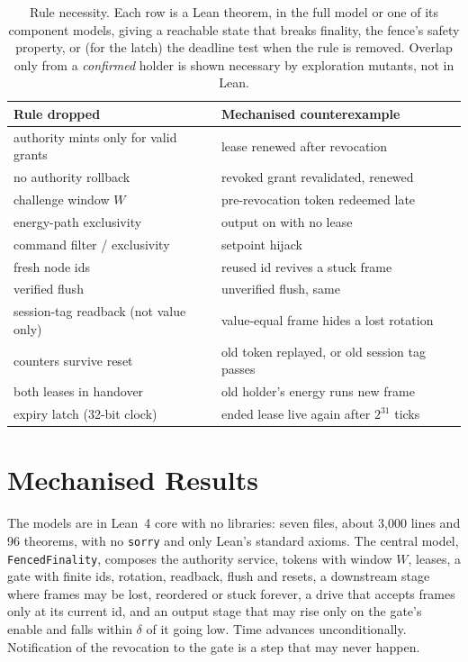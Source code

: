 \documentclass[letterpaper]{article} %
\newcommand{\code}[1]{\texttt{#1}}
\begin{document}
\begin{table}[t]
\centering
\footnotesize
\begin{tabular}{@{}p{3.05cm}p{4.3cm}@{}}
\toprule
Rule dropped & Mechanised counterexample \\
\midrule
authority mints only for valid grants & lease renewed after revocation \\
no authority rollback & revoked grant revalidated, renewed \\
challenge window $W$ & pre-revocation token redeemed late \\
energy-path exclusivity & output on with no lease \\
command filter / exclusivity & setpoint hijack \\
fresh node ids & reused id revives a stuck frame \\
verified flush & unverified flush, same \\
session-tag readback (not value only) & value-equal frame hides a lost rotation \\
counters survive reset & old token replayed, or old session tag passes \\
both leases in handover & old holder's energy runs new frame \\
expiry latch (32-bit clock) & ended lease live again after $2^{31}$ ticks \\
\bottomrule
\end{tabular}
\caption{Rule necessity. Each row is a Lean theorem, in the full model or one of its component
models, giving a reachable state that breaks finality, the fence's safety property, or (for the
latch) the deadline test when the rule is removed. Overlap only from a \emph{confirmed} holder
is shown necessary by exploration mutants, not in Lean.}
\label{tab:rules}
\end{table}

\section{Mechanised Results}
\label{sec:lean}

The models are in Lean~4 core with no libraries: seven files, about 3{,}000 lines and 96
theorems, with no \code{sorry} and only Lean's standard axioms. The central model,
\code{FencedFinality}, composes the authority service, tokens with window $W$, leases, a gate
with finite ids, rotation, readback, flush and resets, a downstream stage where frames may be
lost, reordered or stuck forever, a drive that accepts frames only at its current id, and an
output stage that may rise only on the gate's enable and falls within $\delta$ of it going low.
Time advances unconditionally. Notification of the revocation to the gate is a step that may
never happen.
\end{document}
